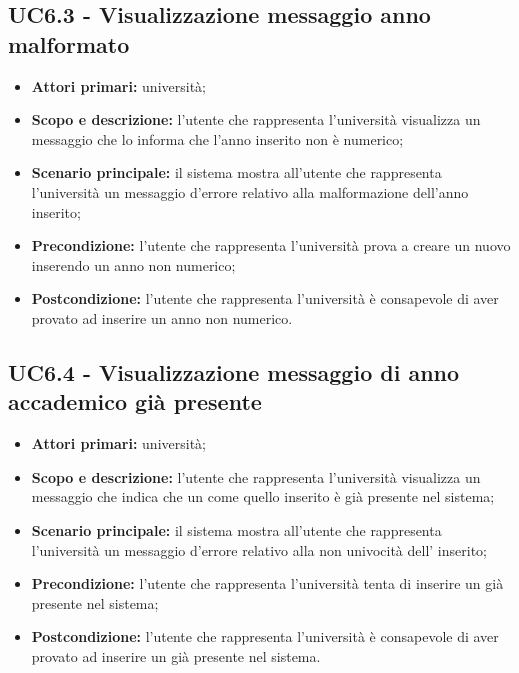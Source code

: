 \documentclass[AnalisiDeiRequisiti.tex]{subfiles}
\begin{document}
\subsection{UC6.3 - Visualizzazione messaggio anno malformato}
\begin{itemize}
	\item \textbf{Attori primari:} università;
	\item \textbf{Scopo e descrizione:} l'utente che rappresenta l'università visualizza un messaggio che lo informa che l'anno inserito non è numerico;
	\item \textbf{Scenario principale:} il sistema mostra all'utente che rappresenta l'università un messaggio d'errore relativo alla malformazione dell'anno inserito;
	\item \textbf{Precondizione:} l'utente che rappresenta l'università prova a creare un nuovo  inserendo un anno non numerico; 
	\item \textbf{Postcondizione:} l'utente che rappresenta l'università è consapevole di aver provato ad inserire un anno non numerico.
\end{itemize}
\subsection{UC6.4 - Visualizzazione messaggio di anno accademico già presente}
\begin{itemize}
	\item \textbf{Attori primari:} università;
	\item \textbf{Scopo e descrizione:} l'utente che rappresenta l'università visualizza un messaggio che indica che un  come quello inserito è già presente nel sistema;
	\item \textbf{Scenario principale:} il sistema mostra all'utente che rappresenta l'università un messaggio d'errore relativo alla non univocità dell' inserito;
	\item \textbf{Precondizione:} l'utente che rappresenta l'università tenta di inserire un  già presente nel sistema; 
	\item \textbf{Postcondizione:} l'utente che rappresenta l'università è consapevole di aver provato ad inserire un  già presente nel sistema.
\end{itemize}
\end{document}
